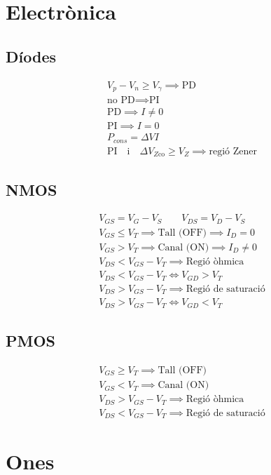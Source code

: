\documentclass[10pt,twocolumn]{article}
\begin{document}
\section{Electrònica}
\subsection{Díodes}
\begin{gather*}
V_p - V_n \geq V_\gamma \implies \text{PD} \\
\text{no PD} \implies \text{PI} \\
\text{PD} \implies I \neq 0 \\
\text{PI} \implies I = 0 \\
P_{cons} = \Delta V I \\
\text{PI} \quad \text{i} \quad \Delta V_{Z \text{co}} \geq V_Z \implies \text{regió Zener}
\end{gather*}
\subsection{NMOS}
\begin{gather*}
V_{GS} = V_G - V_S \qquad V_{DS} = V_D - V_S \\
V_{GS} \leq V_T \implies \text{Tall (OFF)} \implies I_D = 0 \\
V_{GS} > V_T \implies \text{Canal (ON)} \implies I_D \neq 0  \\
V_{DS} < V_{GS} - V_T \implies \text{Regió òhmica} \\
V_{DS} < V_{GS} - V_T \iff V_{GD} > V_T \\
V_{DS} > V_{GS} - V_T \implies \text{Regió de saturació} \\
V_{DS} > V_{GS} - V_T \iff V_{GD} < V_T
\end{gather*}
\subsection{PMOS}
\begin{gather*}
    V_{GS} \geq V_T \implies \text{Tall (OFF)} \\
    V_{GS} < V_T \implies \text{Canal (ON)} \\
    V_{DS} > V_{GS} - V_T \implies \text{Regió òhmica} \\
    V_{DS} < V_{GS} - V_T \implies \text{Regió de saturació}
\end{gather*}
\section{Ones}
\end{document}
